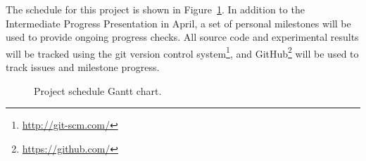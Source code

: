The schedule for this project is shown in Figure~\ref{fig:gantt}. In
addition to the Intermediate Progress Presentation in April, a set of
personal milestones will be used to provide ongoing progress
checks. All source code and experimental results will be tracked using
the git version control system\footnote{\url{http://git-scm.com/}},
and GitHub\footnote{\url{https://github.com/}} will be used to track
issues and milestone progress.

\begin{figure}[b]
\makebox[\textwidth][c]{}
\caption{Project schedule Gantt chart.}
\label{fig:gantt}
\end{figure}
